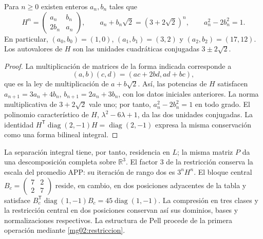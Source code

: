 \begin{corollary}
Para \(n\geq0\) existen enteros \(a_n,b_n\) tales que
\begin{equation}
 H^n=\begin{pmatrix}a_n&b_n\\2b_n&a_n\end{pmatrix},\qquad
 a_n+b_n\sqrt2=(3+2\sqrt2)^n,
 \qquad a_n^2-2b_n^2=1.
 \label{mg02:pell}
\end{equation}
En particular, \((a_0,b_0)=(1,0)\), \((a_1,b_1)=(3,2)\) y
\((a_2,b_2)=(17,12)\). Los autovalores de \(H\) son las unidades
cuadráticas conjugadas \(3\pm2\sqrt2\).
\end{corollary}

\begin{proof}
La multiplicación de matrices de la forma indicada corresponde a
\[
 (a,b)(c,d)=(ac+2bd,ad+bc),
\]
que es la ley de multiplicación de \(a+b\sqrt2\). Así, las potencias
de \(H\) satisfacen
\(a_{n+1}=3a_n+4b_n\), \(b_{n+1}=2a_n+3b_n\), con los datos
iniciales anteriores. La norma multiplicativa de \(3+2\sqrt2\) vale
uno; por tanto, \(a_n^2-2b_n^2=1\) en todo grado. El polinomio
característico de \(H\), \(\lambda^2-6\lambda+1\), da las dos
unidades conjugadas. La identidad
\(H^{\mathsf T}\operatorname{diag}(2,-1)H=
\operatorname{diag}(2,-1)\) expresa la misma conservación como
una forma bilineal integral.
\end{proof}

La separación integral tiene, por tanto, residencia en \(L\); la
misma matriz \(P\) da una descomposición completa sobre
\(\mathbb R^3\). El factor \(3\) de la restricción conserva la
escala del promedio APP: su iteración de rango dos es \(3^nH^n\).
El bloque central \(B_c=\left(\begin{smallmatrix}7&2\\2&7\end{smallmatrix}\right)\)
reside, en cambio, en dos posiciones adyacentes de la tabla y satisface
\(B_c^{\mathsf T}\operatorname{diag}(1,-1)B_c=
45\operatorname{diag}(1,-1)\). La compresión en tres clases y la
restricción central en dos posiciones conservan así sus dominios,
bases y normalizaciones respectivos. La estructura de Pell procede de
la primera operación mediante \eqref{mg02:restriccion}.
